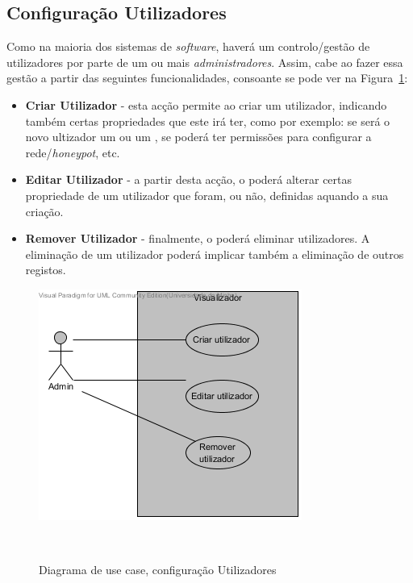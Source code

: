\subsection{\textbf{Configuração Utilizadores}}
Como na maioria dos sistemas de \emph{software}, haverá um controlo/gestão de utilizadores por parte de um ou mais \emph{administradores}. Assim, cabe ao \admini fazer essa gestão a partir das seguintes funcionalidades, consoante se pode ver na Figura~\ref{fig: confutil}:

\begin{itemize}
 \item \textbf{Criar Utilizador} - esta acção permite ao \admini criar um utilizador, indicando também certas propriedades que este irá ter, como por exemplo: se será o novo ultizador um \admini ou um \uticomum, se poderá ter permissões para configurar a rede/\emph{honeypot}, etc.
 \item \textbf{Editar Utilizador} - a partir desta acção, o \admini poderá alterar certas propriedade de um utilizador que foram, ou não, definidas aquando a sua criação.
 \item \textbf{Remover Utilizador} - finalmente, o \admini poderá eliminar utilizadores. A eliminação de um utilizador poderá implicar também a eliminação de outros registos.
\end{itemize}

\begin{figure}[!ht]
\centering
\includegraphics[scale=0.80]{images/ucs/ConfUtilizadores}
\caption {Diagrama de use case, configuração Utilizadores}~\label{fig: confutil}
\end{figure}
\pagebreak

